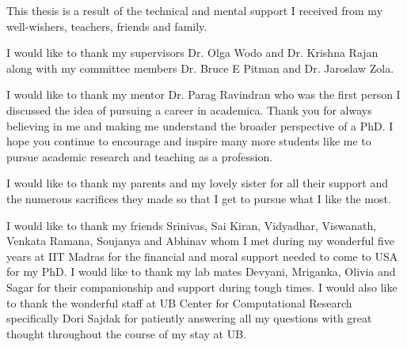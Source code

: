 This thesis is a result of the technical and mental support I received from my well-wishers, teachers, friends and family.


I would like to thank my supervisors Dr. Olga Wodo and Dr. Krishna Rajan along with my committee members Dr. Bruce E Pitman and Dr. Jaroslaw Zola.

I would like to thank my mentor Dr. Parag Ravindran who was the first person I discussed the idea of pursuing a career in academica. Thank you for always believing in me and making me understand the broader perspective of a PhD. I hope you continue to encourage and inspire many more students like me to pursue academic research and teaching as a profession. 

I would like to thank my parents and my lovely sister for all their support and the numerous sacrifices they made so that I get to pursue what I like the most.

I would like to thank my friends Srinivas, Sai Kiran, Vidyadhar, Viswanath, Venkata Ramana, Soujanya and Abhinav whom I met during my wonderful five years at IIT Madras for the financial and moral support needed to come to USA for my PhD. 
I would like to thank my lab mates Devyani, Mriganka, Olivia and Sagar for their companionship and support during tough times. 
I would also like to thank the wonderful staff at UB Center for Computational Research specifically Dori Sajdak for patiently answering all my questions with great thought throughout the course of my stay at UB.

